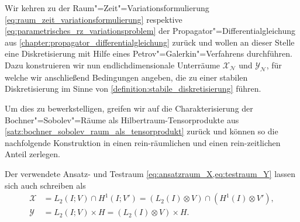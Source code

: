 \documentclass[../main.tex]{subfiles}
\begin{document}
Wir kehren zu der Raum"=Zeit"=Variationsformulierung \cref{eq:raum_zeit_variationsformulierung} respektive \cref{eq:parametrisches_rz_variationsproblem} der Propagator"=Differentialgleichung aus \cref{chapter:propagator_differentialgleichung} zurück und wollen an dieser Stelle eine Diskretisierung mit Hilfe eines Petrov"=Galerkin"=Verfahrens durchführen.
Dazu konstruieren wir nun endlichdimensionale Unterräume $\mathcal X_{\mathcal N}$ und $\mathcal Y_{\mathcal N}$, für welche wir anschließend Bedingungen angeben, die zu einer stabilen Diskretisierung im Sinne von \cref{definition:stabile_diskretisierung} führen.

Um dies zu bewerkstelligen, greifen wir auf die Charakterisierung der Bochner"=Sobolev"=Räume als Hilbertraum-Tensorprodukte aus \cref{satz:bochner_sobolev_raum_als_tensorprodukt} zurück und können so die nachfolgende Konstruktion in einen rein-räumlichen und einen rein-zeitlichen Anteil zerlegen.

\begin{Korollar}
    Der verwendete Ansatz- und Testraum \cref{eq:ansatzraum_X,eq:testraum_Y} lassen sich auch schreiben als
    \begin{equation}
        \label{eq:ansatzraum_testraum_tensor}
        \begin{aligned}
        \mathcal X &= L_{2}(I; V) \cap H^{1}(I; V')
            = (L_2(I) \otimes V) \cap (H^{1}(I) \otimes V'),\\
        \mathcal Y &= L_{2}(I; V) \times H = (L_{2}(I) \otimes V) \times H.
        \end{aligned}
    \end{equation}
\end{Korollar}
\end{document}
